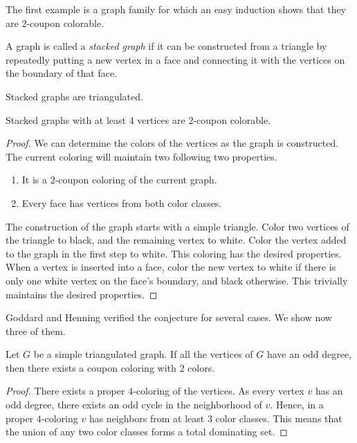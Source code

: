 The first example is a graph family for which an easy induction shows that they
are $2$-coupon colorable.

\begin{definition}
  A graph is called a \emph{stacked graph} if it can be constructed from a triangle by
  repeatedly putting a new vertex in a face and connecting it with the vertices on
  the boundary of that face.
\end{definition}
\begin{remark}
  Stacked graphs are triangulated.
\end{remark}
\begin{claim}
  Stacked graphs with at least $4$ vertices are $2$-coupon colorable.
\end{claim}
\begin{proof}
  We can determine the colors of the vertices as the graph is constructed. The
  current coloring will maintain two following two properties.
  \begin{enumerate}
    \item It is a $2$-coupon coloring of the current graph.
    \item Every face has vertices from both color classes.
  \end{enumerate}
  The construction of the graph starts with a simple triangle. Color two vertices
  of the triangle to black, and the remaining vertex to white. Color the vertex added
  to the graph in the first step to white. This coloring has the desired properties.
  When a vertex is inserted into a face, color the new vertex to white if there is
  only one white vertex on the face's boundary, and black otherwise. This trivially
  maintains the desired properties.
\end{proof}

Goddard and Henning \cite{gh} verified the conjecture for several cases. We show now three
of them.

\begin{claim} \label{c:odd}
  Let $G$ be a simple triangulated graph. If all the
  vertices of $G$ have an odd degree, then there exists a coupon coloring with $2$ colors.
\end{claim}
\begin{proof}
  There exists a proper $4$-coloring of the vertices. As every vertex $v$ has an
  odd degree, there exists an odd cycle in the neighborhood of $v$. Hence, in a proper
  $4$-coloring $v$ has neighbors from at least $3$ color classes. This means that
  the union of any two color classes forms a total dominating set.
\end{proof}

